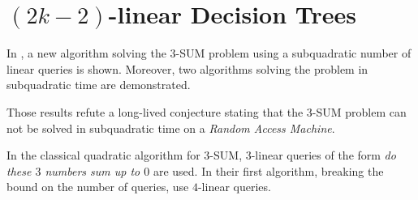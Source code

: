 \section{$(2k-2)$-linear Decision Trees}

In \cite{gronlund:2014}, a new algorithm solving the $3$-SUM problem using a
subquadratic number of linear queries is shown. Moreover, two algorithms
solving the problem in subquadratic time are demonstrated.

Those results refute a long-lived conjecture stating that the $3$-SUM problem
can not be solved in subquadratic time on a \emph{Random Access Machine}.

In the classical quadratic algorithm for $3$-SUM, $3$-linear queries of the
form \emph{do these $3$ numbers sum up to $0$} are used. In their first
algorithm, breaking the  bound on the number of queries,
\citeauthor{gronlund:2014} use $4$-linear queries.
